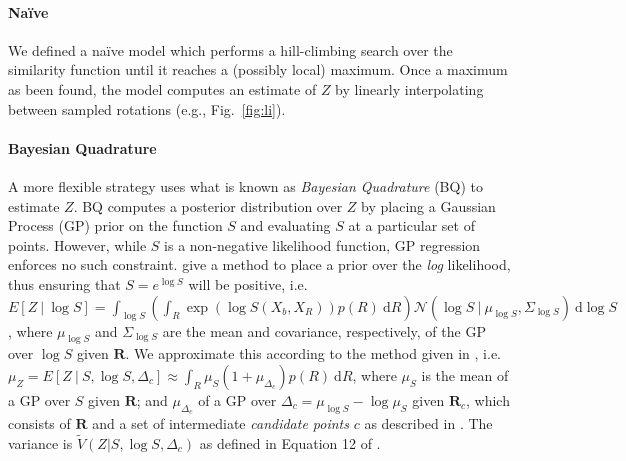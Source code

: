 \documentclass{article} %
\newcommand{\naive}[0]{na\"ive}
\newcommand{\Naive}[0]{Na\"ive}
\begin{document}
\paragraph{\Naive{}}

We defined a \naive{} model which performs a hill-climbing search over
the similarity function until it reaches a (possibly local)
maximum. Once a maximum as been found, the model computes an estimate
of $Z$ by linearly interpolating between sampled rotations (e.g.,
Fig.~\ref{fig:li}).

\paragraph{Bayesian Quadrature}

A more flexible strategy uses what is known as \emph{Bayesian
  Quadrature} (BQ) \cite{Diaconis:1988uo,OHagan:1991tx} to estimate
$Z$.  BQ computes a posterior distribution over $Z$ by placing a
Gaussian Process (GP) prior on the function $S$ and evaluating $S$ at
a particular set of points. However, while $S$ is a non-negative
likelihood function, GP regression enforces no such
constraint. \cite{Osborne:2012tm} give a method to place a prior over
the \textit{log} likelihood, thus ensuring that $S=e^{\log S}$ will be
positive, i.e.  $E[Z\ \vert \ \log S]=\int_{\log S}\left(\int_R
  \exp(\log{S(X_b,X_R)})p(R)\
  \mathrm{d}R\right)\mathcal{N}\left(\log{S}\ \vert \ \mu_{\log S},
  \Sigma_{\log S}\right)\ \mathrm{d}\log S$, where $\mu_{\log S}$ and
$\Sigma_{\log S}$ are the mean and covariance, respectively, of the GP
over $\log S$ given $\mathbf{R}$. We approximate this according to the
method given in \cite{Osborne:2012tm}, i.e. $\mu_Z=E[Z\ \vert \ S,
\log S, \Delta_c] \approx \int_R \mu_{S}(1 + \mu_{\Delta_c}) p(R)\
\mathrm{d}R$, where $\mu_S$ is the mean of a GP over $S$ given
$\mathbf{R}$; and $\mu_{\Delta_c}$ of a GP over $\Delta_c=\mu_{\log S}
- \log \mu_S$ given $\mathbf{R}_c$, which consists of $\mathbf{R}$ and
a set of intermediate \emph{candidate points} $c$ as described in
\cite{Osborne:2012tm}. The variance is $\tilde{V}(Z\vert S, \log S,
\Delta_c)$ as defined in Equation 12 of \cite{Osborne:2012tm}.
\end{document}
